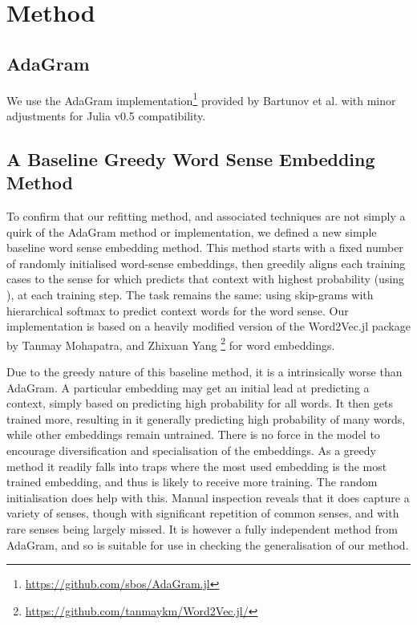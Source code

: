 \documentclass{sig-alternate}
\begin{document}
\section{Method}

\subsection{AdaGram}


We use the AdaGram \parencite{AdaGrams} implementation\footnote{\url{https://github.com/sbos/AdaGram.jl}} provided by Bartunov et al. with minor adjustments for Julia v0.5 compatibility.

\subsection{A Baseline Greedy Word Sense Embedding Method}

To confirm that our refitting method, and associated techniques are not simply a quirk of the AdaGram method or implementation, we defined a new simple baseline word sense embedding method.
This method starts with a fixed number of randomly initialised word-sense embeddings, then greedily aligns each training cases to the sense for which predicts that context with highest probability (using ), at each training step. The task remains the same: using skip-grams with hierarchical softmax to predict context words for the word sense.
Our implementation is based on a heavily modified version of the Word2Vec.jl package by Tanmay Mohapatra, and Zhixuan Yang \footnote{\url{https://github.com/tanmaykm/Word2Vec.jl/}} for word embeddings.

Due to the greedy nature of this baseline method, it is a intrinsically worse than AdaGram. A particular embedding may get an initial lead at predicting a context, simply based on predicting high probability for all words. It then gets trained more, resulting in it generally predicting high probability of many words, while other embeddings remain untrained. There is no force in the model to encourage diversification and specialisation of the embeddings. As a greedy method it readily falls into traps where the most used embedding is the most trained embedding, and thus is likely to receive more training. The random initialisation does help with this. Manual inspection reveals that it does capture a variety of senses, though with significant repetition of common senses, and with rare senses being largely missed. It is however a fully independent method from AdaGram, and so is suitable for use in checking the generalisation of our method.
\end{document}
